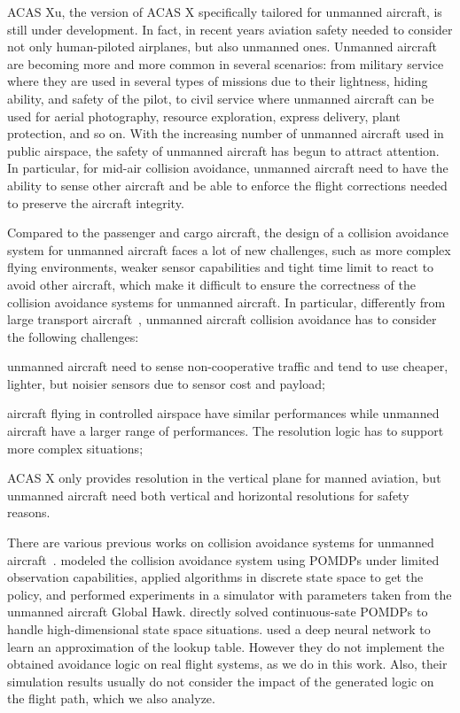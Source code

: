 \documentclass[orivec]{llncs}
\begin{document}
ACAS Xu, the version of ACAS X specifically tailored for unmanned aircraft, is still under development. 
In fact, in recent years aviation safety needed to consider not only human-piloted airplanes, but also unmanned ones.
Unmanned aircraft are becoming more and more common in several scenarios:
from military service where they are used in several types of missions due to their lightness, hiding ability, and safety of the pilot, to civil service where unmanned aircraft can be used for aerial photography, resource exploration, express delivery, plant protection, and so on.
With the increasing number of unmanned aircraft used in public airspace, the safety of unmanned aircraft has begun to attract attention.
In particular, for mid-air collision avoidance, unmanned aircraft need to have the ability to sense other aircraft and be able to enforce the flight corrections needed to preserve the aircraft integrity.

Compared to the passenger and cargo aircraft, the design of a collision avoidance system for unmanned aircraft faces a lot of new challenges, such as more complex flying environments, weaker sensor capabilities and tight time limit to react to avoid other aircraft, which make it difficult to ensure the correctness of the collision avoidance systems for unmanned aircraft.
In particular, differently from large transport aircraft~\cite{inproceedings}, unmanned aircraft collision avoidance has to consider the following challenges: 
\begin{inparaenum}[1)]
\item
	unmanned aircraft need to sense non-cooperative traffic and tend to use cheaper, lighter, but noisier sensors due to sensor cost and payload;
\item
	aircraft flying in controlled airspace have similar performances while unmanned aircraft have a larger range of performances. 
	The resolution logic has to support more complex situations;
\item
	ACAS X only provides resolution in the vertical plane for manned aviation, but unmanned aircraft need both vertical and horizontal resolutions for safety reasons.
\end{inparaenum}

There are various previous works on collision avoidance systems for unmanned aircraft~\cite{DBLP:conf/rss/Bai-RSS-11,25,Julian-2016}.
\cite{25} modeled the collision avoidance system using POMDPs under limited observation capabilities,
applied algorithms in discrete state space to get the policy,
and performed experiments in a simulator with parameters taken from the unmanned aircraft Global Hawk.
\cite{DBLP:conf/rss/Bai-RSS-11} directly solved continuous-sate POMDPs to handle high-dimensional state space situations.
\cite{Julian-2016} used a deep neural network to learn an approximation of the lookup table.
However they do not implement the obtained avoidance logic on real flight systems, as we do in this work.
Also, their simulation results usually do not consider the impact of the generated logic on the flight path, which we also analyze.
\end{document}
